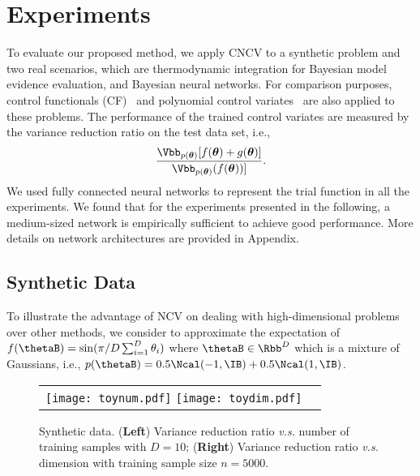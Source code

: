 \documentclass[runningheads]{llncs}
\begin{document}


\section{Experiments}
\label{sec:app}
To evaluate our proposed method, we apply CNCV to a synthetic problem and two real scenarios, which are thermodynamic integration for Bayesian model evidence evaluation, and Bayesian neural networks. For comparison purposes, control functionals (CF)~\cite{oates2017control} and polynomial control variates~\cite{mira2013zero,oates2016controlled} are also applied to these problems.
The performance of the trained control variates are measured by the variance reduction ratio on the test data set, i.e.,
$$
\frac{\Vbb_{p(\bm{\theta})}[f(\bm{\theta}) + g(\bm{\theta})] }{\Vbb_{p(\bm{\theta})}(f(\bm{\theta}))]}.
$$
 We used fully connected neural networks to represent the trial function in all the experiments. We found that for the experiments presented in the following, a medium-sized network is empirically sufficient to achieve good performance. More details on network architectures are provided in Appendix.

 
\subsection{Synthetic Data}
To illustrate the advantage of NCV on dealing with high-dimensional problems over other methods, we consider to approximate the expectation of $f(\thetaB) = \sin(\pi /D \sum_{i=1}^D \theta_i )$ where $\thetaB \in \Rbb^D $ which is a mixture of Gaussians, i.e., $p(\thetaB) = 0.5\Ncal(-1, \IB) + 0.5 \Ncal(1,\IB)$.

\begin{figure*}[t!]
\centering
\vspace{-0.1cm}
\begin{tabular}{cc}
\texttt{[image: toynum.pdf]}
\texttt{[image: toydim.pdf]}
\end{tabular}
\vspace{-0.2cm}
\caption{\small Synthetic data. (\textbf{Left}) Variance reduction ratio \emph{v.s.}  number of training  samples with $D=10$; (\textbf{Right}) Variance reduction ratio \emph{v.s.} dimension with training sample size $n=5000$.}
\label{fig:synthetic}
\end{figure*}
\end{document}
